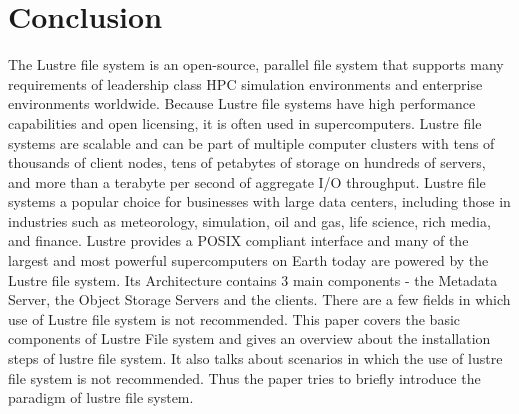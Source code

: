 \documentclass[9pt,twocolumn,twoside]{styles/osajnl}
\begin{document}
\section{Conclusion}

The Lustre file system is an open-source, parallel file system that
supports many requirements of leadership class HPC simulation
environments and enterprise environments worldwide. Because Lustre
file systems have high performance capabilities and open licensing, it
is often used in supercomputers. Lustre file systems are scalable and
can be part of multiple computer clusters with tens of thousands of
client nodes, tens of petabytes of storage on hundreds of servers, and
more than a terabyte per second of aggregate I/O throughput. Lustre
file systems a popular choice for businesses with large data centers,
including those in industries such as meteorology, simulation, oil and
gas, life science, rich media, and finance. Lustre provides a POSIX
compliant interface and many of the largest and most powerful
supercomputers on Earth today are powered by the Lustre file
system. Its Architecture contains 3 main components - the Metadata
Server, the Object Storage Servers and the clients. There are a few
fields in which use of Lustre file system is not recommended. This
paper covers the basic components of Lustre File system and gives an
overview about the installation steps of lustre file system. It also
talks about scenarios in which the use of lustre file system is not
recommended. Thus the paper tries to briefly introduce the paradigm of
lustre file system.



\end{document}
